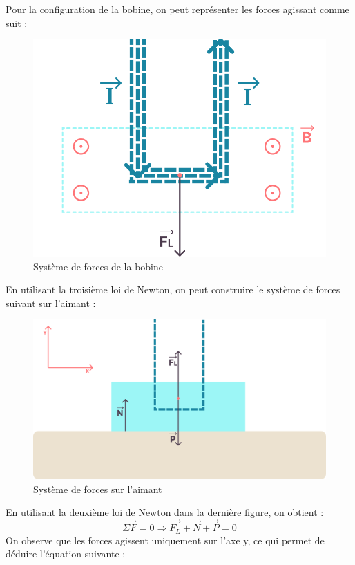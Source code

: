 \documentclass[12pt,a4paper]{article}
\begin{document}
    Pour la configuration de la bobine, on peut représenter les forces agissant comme suit :
    \begin{figure}[H]
        \centering
        \includegraphics[scale=0.5]{images/magnet_coil.pdf}
        \caption{Système de forces de la bobine}
    \end{figure}
    En utilisant la troisième loi de Newton, on peut construire le système de forces suivant sur l'aimant :
    \begin{figure}[H]
        \centering
        \includegraphics[scale=0.5]{images/magnet_side.pdf}
        \caption{Système de forces sur l'aimant}
    \end{figure}
    En utilisant la deuxième loi de Newton dans la dernière figure, on obtient :
    \begin{equation*}
        \Sigma \vec{F} = 0 \Rightarrow \vec{F_L} + \vec{N} + \vec{P} = 0
    \end{equation*}
    On observe que les forces agissent uniquement sur l'axe y, ce qui permet de déduire l'équation suivante :
\end{document}
